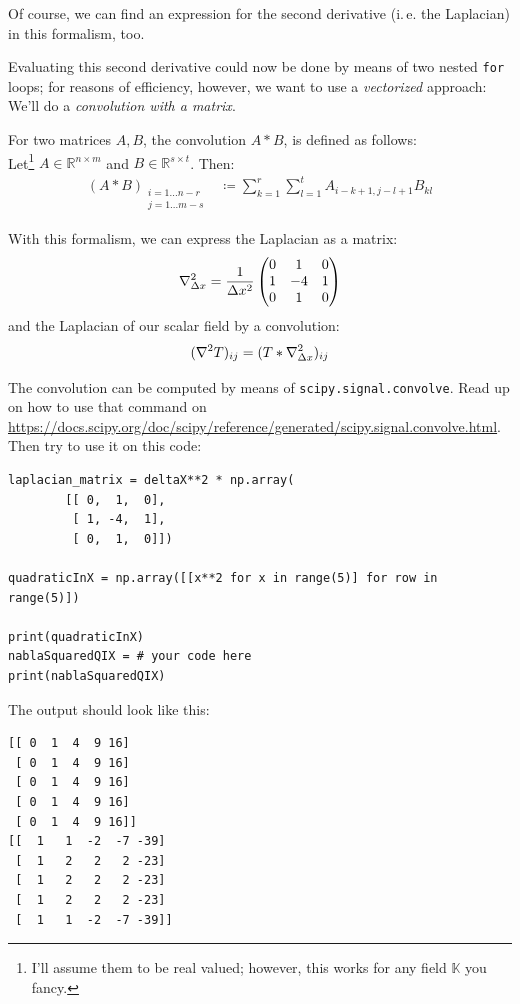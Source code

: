 \documentclass[
	english,
	fontsize=10pt,
	parskip=half,
	titlepage=true,
	DIV=12
]{scrartcl}
\newcommand*{\inPy}[1]{\texttt{#1}}
\newcommand*{\ie}{i.\,e. }
\begin{document}
Of course, we can find an expression for the second derivative (\ie the Laplacian) in this formalism, too.

Evaluating this second derivative could now be done by means of two nested \inPy{for} loops; for reasons of efficiency, however, we want to use a \emph{vectorized} approach: We'll do a \emph{convolution with a matrix}.

For two matrices $A, B$, the convolution $A \ast B$, is defined as follows:\\
Let\footnote{I'll assume them to be real valued; however, this works for any field $\mathbb{K}$ you fancy.} $A \in \mathbb{R}^{n \times m}$ and $B \in \mathbb{R}^{s \times t}$. Then:
\begin{align*}
	(A \ast B)_{\substack{
		i = 1 ... n-r\\
		j = 1 ... m-s
	}}
&\coloneqq
	\sum_{k = 1}^{r}
	\sum_{l = 1}^{t}
		A_{i-k+1, j-l+1} B_{kl}
\end{align*}

With this formalism, we can express the Laplacian as a matrix:
\[ 
	\laplacian_{\Delta x} 
= 
	\frac{1}{\Delta x^2}
	\begin{pmatrix}
		 0 &  1 &  0 \\
		 1 & -4 &  1 \\
		 0 &  1 &  0
	\end{pmatrix}
\]
and the Laplacian of our scalar field by a convolution:
\[ (\laplacian T)_{ij} = (T \ast \laplacian_{\Delta x})_{ij} \]

The convolution can be computed by means of \texttt{scipy.signal.convolve}. Read up on how to use that command on \url{https://docs.scipy.org/doc/scipy/reference/generated/scipy.signal.convolve.html}. Then try to use it on this code:
\begin{verbatim}
laplacian_matrix = deltaX**2 * np.array(
        [[ 0,  1,  0],
         [ 1, -4,  1],
         [ 0,  1,  0]])

quadraticInX = np.array([[x**2 for x in range(5)] for row in range(5)])

print(quadraticInX)
nablaSquaredQIX = # your code here
print(nablaSquaredQIX)
\end{verbatim}

The output should look like this:
\begin{verbatim}
[[ 0  1  4  9 16]
 [ 0  1  4  9 16]
 [ 0  1  4  9 16]
 [ 0  1  4  9 16]
 [ 0  1  4  9 16]]
[[  1   1  -2  -7 -39]
 [  1   2   2   2 -23]
 [  1   2   2   2 -23]
 [  1   2   2   2 -23]
 [  1   1  -2  -7 -39]]
\end{verbatim}
\end{document}
